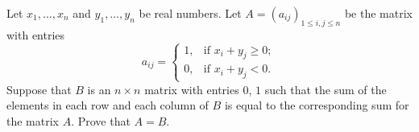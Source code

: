 Let $x_1, \ldots, x_n$ and $y_1, \ldots, y_n$ be real numbers. Let $A = (a_{ij})_{1 \leq i,j \leq n}$ be the matrix with entries
\[ a_{ij} = \begin{cases} 1, & \text{if } x_i + y_j \geq 0; \\ 0, & \text{if } x_i + y_j < 0. \end{cases} \]
Suppose that $B$ is an $n \times n$ matrix with entries $0$, $1$ such that the sum of the elements in each row and each column of $B$ is equal to the corresponding sum for the matrix $A$. Prove that $A = B$.

